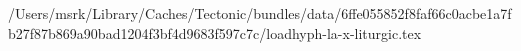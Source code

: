 /Users/msrk/Library/Caches/Tectonic/bundles/data/6ffe055852f8faf66c0acbe1a7fb27f87b869a90bad1204f3bf4d9683f597c7c/loadhyph-la-x-liturgic.tex